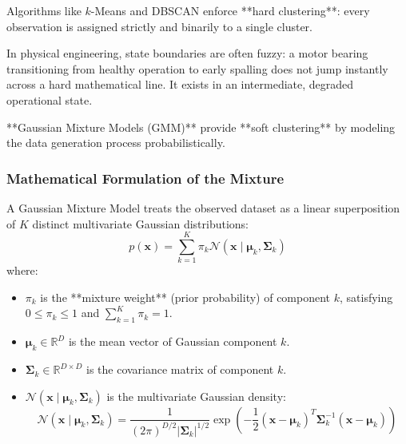 Algorithms like $k$-Means and DBSCAN enforce **hard clustering**: every observation is assigned strictly and binarily to a single cluster. 

In physical engineering, state boundaries are often fuzzy: a motor bearing transitioning from healthy operation to early spalling does not jump instantly across a hard mathematical line. It exists in an intermediate, degraded operational state.

**Gaussian Mixture Models (GMM)** provide **soft clustering** by modeling the data generation process probabilistically.

\subsubsection{Mathematical Formulation of the Mixture}
A Gaussian Mixture Model treats the observed dataset as a linear superposition of $K$ distinct multivariate Gaussian distributions:
\begin{equation}
p(\mathbf{x}) = \sum_{k=1}^{K} \pi_k \mathcal{N}(\mathbf{x} \mid \boldsymbol{\mu}_k, \mathbf{\Sigma}_k)\label{eq:gmm_probability_density}
\end{equation}
where:
\begin{itemize}
    \item $\pi_k$ is the **mixture weight** (prior probability) of component $k$, satisfying $0 \le \pi_k \le 1$ and $\sum_{k=1}^K \pi_k = 1$.
    \item $\boldsymbol{\mu}_k \in \mathbb{R}^D$ is the mean vector of Gaussian component $k$.
    \item $\mathbf{\Sigma}_k \in \mathbb{R}^{D \times D}$ is the covariance matrix of component $k$.
    \item $\mathcal{N}(\mathbf{x} \mid \boldsymbol{\mu}_k, \mathbf{\Sigma}_k)$ is the multivariate Gaussian density:
    \begin{equation}
    \mathcal{N}(\mathbf{x} \mid \boldsymbol{\mu}_k, \mathbf{\Sigma}_k) = \frac{1}{(2\pi)^{D/2} |\mathbf{\Sigma}_k|^{1/2}} \exp\left( -\frac{1}{2} (\mathbf{x} - \boldsymbol{\mu}_k)^T \mathbf{\Sigma}_k^{-1} (\mathbf{x} - \boldsymbol{\mu}_k) \right)\label{eq:multivariate_gaussian_def}
    \end{equation}
\end{itemize}

